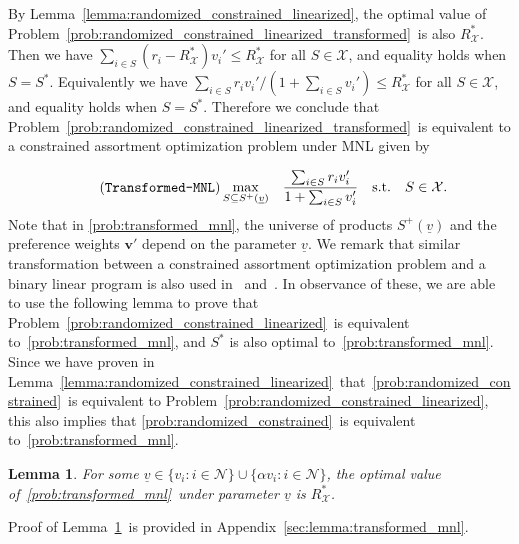 \documentclass[mnsc,non-blindrev]{informs3}
\newtheorem{lemma}[theorem]{Lemma}
\theoremstyle{definition}
\begin{document}
By Lemma~\ref{lemma:randomized_constrained_linearized}, the optimal value of Problem~\eqref{prob:randomized_constrained_linearized_transformed}~is also $R^*_{\mathcal{X}}$. Then we have \mbox{$\sum_{i\in S}(r_i-R^*_{\mathcal{X}})v_i'\leq R^*_{\mathcal{X}}$} for all $S\in\mathcal{X}$, and equality holds when $S=S^*$. Equivalently we have \mbox{$\sum_{i\in S}r_iv_i'/(1+\sum_{i\in S}v_i')\leq R^*_{\mathcal{X}}$} for all $S\in\mathcal{X}$, and equality holds when $S=S^*$. Therefore we conclude that Problem~\eqref{prob:randomized_constrained_linearized_transformed}~is equivalent to a constrained assortment optimization problem under MNL given by

\begin{equation}\label{prob:transformed_mnl}
\tag{\texttt{Transformed-MNL}}
\begin{aligned}
&\max_{S\subseteq S^+(\underline{v})}&&\dfrac{\sum_{i\in S}r_iv_i'}{1+\sum_{i\in S}v_i'}
&\text{s.t.}&&S\in\mathcal{X}.
\end{aligned}
\end{equation}
Note that in \ref{prob:transformed_mnl}, the universe of products $S^+(\underline{v})$ and the preference weights $\bm{v}'$ depend on the parameter $\underline{v}$. We remark that similar transformation between a constrained assortment optimization problem and a binary linear program is also used in \cite{rusmevichientong2010dynamic}~and~\cite{sumida2021revenue}. In observance of these, we are able to use the following lemma to prove that Problem~\eqref{prob:randomized_constrained_linearized}~is equivalent to~\ref{prob:transformed_mnl}, and $S^*$ is also optimal to~\ref{prob:transformed_mnl}. Since we have proven in Lemma~\ref{lemma:randomized_constrained_linearized}~that~\ref{prob:randomized_constrained}~is equivalent to Problem~\eqref{prob:randomized_constrained_linearized}, this also implies that \ref{prob:randomized_constrained}~is equivalent to~\ref{prob:transformed_mnl}.

\vspace{0.5em}

\begin{lemma}\label{lemma:transformed_mnl}
{  For some $\underline{v}\in\{v_i:i\in\mathcal{N}\}\cup \{\alpha v_i:i\in\mathcal{N}\}$}, the optimal value of~\ref{prob:transformed_mnl}~under parameter $\underline{v}$ is $R^*_{\mathcal{X}}$.
\end{lemma}

\vspace{0.5em}

Proof of Lemma~\ref{lemma:transformed_mnl}~is provided in Appendix~\ref{sec:lemma:transformed_mnl}.
\end{document}
